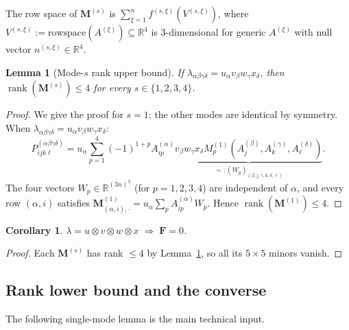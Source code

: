 \documentclass[12pt]{article}
\newtheorem{lemma}[theorem]{Lemma}
\newtheorem{corollary}[theorem]{Corollary}
\theoremstyle{definition}
\DeclareMathOperator{\rank}{rank}
\newcommand{\bR}{\mathbb{R}}
\begin{document}
The row space of $\mathbf{M}^{(s)}$ is $\sum_{\xi=1}^n f^{(s,\xi)}(V^{(s,\xi)})$, where
$V^{(s,\xi)}:=\mathrm{rowspace}(A^{(\xi)})\subseteq\bR^4$ is 3-dimensional for generic
$A^{(\xi)}$ with null vector $n^{(s,\xi)}\in\bR^4$.

\begin{lemma}[Mode-$s$ rank upper bound]\label{lem:rank-ub}
If $\lambda_{\alpha\beta\gamma\delta}=u_\alpha v_\beta w_\gamma x_\delta$, then
$\rank(\mathbf{M}^{(s)})\leq 4$ for every $s\in\{1,2,3,4\}$.
\end{lemma}

\begin{proof}
We give the proof for $s=1$; the other modes are identical by symmetry.
When $\lambda_{\alpha\beta\gamma\delta}=u_\alpha v_\beta w_\gamma x_\delta$:
\[
  P^{(\alpha\beta\gamma\delta)}_{ijk\ell}
  = u_\alpha\sum_{p=1}^4(-1)^{1+p}A^{(\alpha)}_{ip}
    \underbrace{v_\beta w_\gamma x_\delta M^{(1)}_p(A^{(\beta)}_j,A^{(\gamma)}_k,A^{(\delta)}_\ell)}_{=:(W_p)_{(\beta,j,\gamma,k,\delta,\ell)}}.
\]
The four vectors $W_p\in\bR^{(3n)^3}$ (for $p=1,2,3,4$) are independent of $\alpha$, and
every row $(\alpha,i)$ satisfies $\mathbf{M}^{(1)}_{(\alpha,i),\cdot}=u_\alpha\sum_p A^{(\alpha)}_{ip}W_p$.
Hence $\rank(\mathbf{M}^{(1)})\leq 4$.
\end{proof}

\begin{corollary}\label{cor:vanish}
$\lambda=u\otimes v\otimes w\otimes x\;\Longrightarrow\;\mathbf{F}=0$.
\end{corollary}

\begin{proof}
Each $\mathbf{M}^{(s)}$ has rank $\leq4$ by Lemma~\ref{lem:rank-ub}, so all its $5\times5$
minors vanish.
\end{proof}

\subsection{Rank lower bound and the converse}

The following single-mode lemma is the main technical input.
\end{document}
